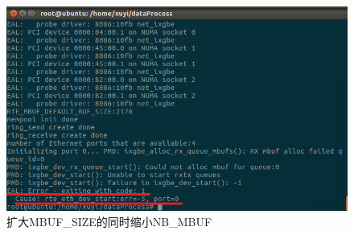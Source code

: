 \documentclass{article}
\begin{document}
\begin{figure}[H]
	\centering
	\includegraphics[width = .8\textwidth]{fault_dev.png}
	\caption{扩大MBUF\_SIZE的同时缩小NB\_MBUF}
\end{figure}

\end{document}
